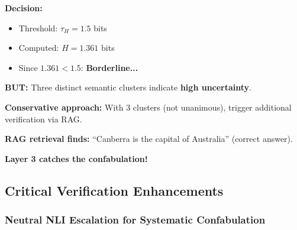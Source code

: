\documentclass[12pt,a4paper]{article}
\theoremstyle{definition}
\begin{document}
\begin{examplebox}[title=Semantic Entropy Catches Confabulation]
\textbf{Decision:}
\begin{itemize}
    \item Threshold: $\tau_H = 1.5$ bits
    \item Computed: $H = 1.361$ bits
    \item Since $1.361 < 1.5$: \textbf{Borderline...}
\end{itemize}

\textbf{BUT:} Three distinct semantic clusters indicate \textbf{high uncertainty}.

\textbf{Conservative approach:} With 3 clusters (not unanimous), trigger additional verification via RAG.

\textbf{RAG retrieval finds:} ``Canberra is the capital of Australia'' (correct answer).

\textbf{Layer 3 catches the confabulation!}
\end{examplebox}

\subsection{Critical Verification Enhancements}

\subsubsection{Neutral NLI Escalation for Systematic Confabulation}
\end{document}
